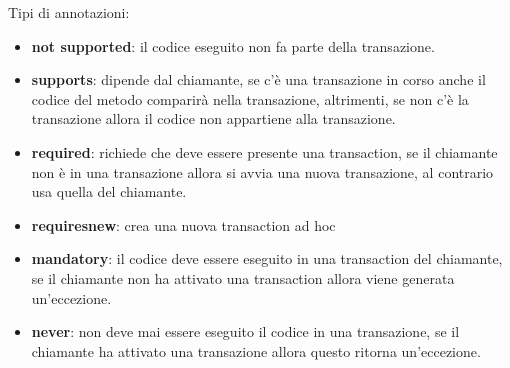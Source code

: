 Tipi di annotazioni:
\begin{itemize}
    \item \textbf{not supported}: il codice eseguito non fa parte della transazione.
    \item \textbf{supports}: dipende dal chiamante, se c'è una transazione in corso 
    anche il codice del metodo comparirà nella transazione, altrimenti, se non c'è 
    la transazione allora il codice non appartiene alla transazione.
    \item \textbf{required}: richiede che deve essere presente una transaction, se il chiamante
    non è in una transazione allora si avvia una nuova transazione, al contrario usa 
    quella del chiamante.
    \item \textbf{requiresnew}: crea una nuova transaction ad hoc
    \item \textbf{mandatory}: il codice deve essere eseguito in una transaction del 
    chiamante, se il chiamante non ha attivato una transaction allora viene generata
    un'eccezione.
    \item \textbf{never}: non deve mai essere eseguito il codice in una transazione,
    se il chiamante ha attivato una transazione allora questo ritorna un'eccezione.
\end{itemize}

